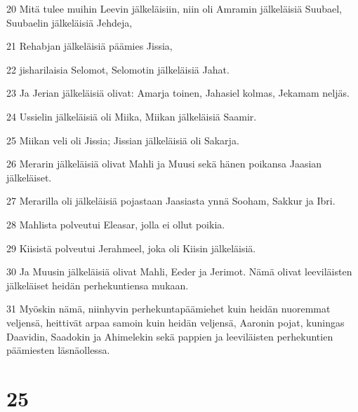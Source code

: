 \par 20 Mitä tulee muihin Leevin jälkeläisiin, niin oli Amramin jälkeläisiä Suubael, Suubaelin jälkeläisiä Jehdeja,
\par 21 Rehabjan jälkeläisiä päämies Jissia,
\par 22 jisharilaisia Selomot, Selomotin jälkeläisiä Jahat.
\par 23 Ja Jerian jälkeläisiä olivat: Amarja toinen, Jahasiel kolmas, Jekamam neljäs.
\par 24 Ussielin jälkeläisiä oli Miika, Miikan jälkeläisiä Saamir.
\par 25 Miikan veli oli Jissia; Jissian jälkeläisiä oli Sakarja.
\par 26 Merarin jälkeläisiä olivat Mahli ja Muusi sekä hänen poikansa Jaasian jälkeläiset.
\par 27 Merarilla oli jälkeläisiä pojastaan Jaasiasta ynnä Sooham, Sakkur ja Ibri.
\par 28 Mahlista polveutui Eleasar, jolla ei ollut poikia.
\par 29 Kiisistä polveutui Jerahmeel, joka oli Kiisin jälkeläisiä.
\par 30 Ja Muusin jälkeläisiä olivat Mahli, Eeder ja Jerimot. Nämä olivat leeviläisten jälkeläiset heidän perhekuntiensa mukaan.
\par 31 Myöskin nämä, niinhyvin perhekuntapäämiehet kuin heidän nuoremmat veljensä, heittivät arpaa samoin kuin heidän veljensä, Aaronin pojat, kuningas Daavidin, Saadokin ja Ahimelekin sekä pappien ja leeviläisten perhekuntien päämiesten läsnäollessa.

\chapter{25}

